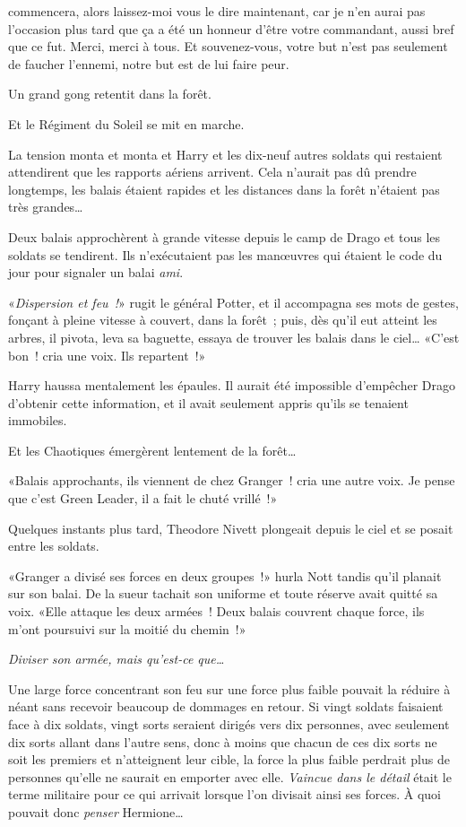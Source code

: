 commencera, alors laissez-moi vous le dire maintenant, car je n'en aurai pas l'occasion plus tard que ça a été un honneur d'être votre commandant, aussi bref que ce fut. Merci, merci à tous. Et souvenez-vous, votre but n'est pas seulement de faucher l'ennemi, notre but est de lui faire peur.

\later

Un grand gong retentit dans la forêt.

Et le Régiment du Soleil se mit en marche.

\later

La tension monta et monta et Harry et les dix-neuf autres soldats qui restaient attendirent que les rapports aériens arrivent. Cela n'aurait pas dû prendre longtemps, les balais étaient rapides et les distances dans la forêt n'étaient pas très grandes…

Deux balais approchèrent à grande vitesse depuis le camp de Drago et tous les soldats se tendirent. Ils n'exécutaient pas les manœuvres qui étaient le code du jour pour signaler un balai \emph{ami}.

«\emph{Dispersion et feu~!}» rugit le général Potter, et il accompagna ses mots de gestes, fonçant à pleine vitesse à couvert, dans la forêt~; puis, dès qu'il eut atteint les arbres, il pivota, leva sa baguette, essaya de trouver les balais dans le ciel…
«C'est bon~! cria une voix. Ils repartent~!»

Harry haussa mentalement les épaules. Il aurait été impossible d'empêcher Drago d'obtenir cette information, et il avait seulement appris qu'ils se tenaient immobiles.

Et les Chaotiques émergèrent lentement de la forêt…

«Balais approchants, ils viennent de chez Granger~! cria une autre voix. Je pense que c'est Green Leader, il a fait le chuté vrillé~!»

Quelques instants plus tard, Theodore Nivett plongeait depuis le ciel et se posait entre les soldats.

«Granger a divisé ses forces en deux groupes~!» hurla Nott tandis qu'il planait sur son balai. De la sueur tachait son uniforme et toute réserve avait quitté sa voix. «Elle attaque les deux armées~! Deux balais couvrent chaque force, ils m'ont poursuivi sur la moitié du chemin~!»

\emph{Diviser son armée, mais qu'est-ce que…}

Une large force concentrant son feu sur une force plus faible pouvait la réduire à néant sans recevoir beaucoup de dommages en retour. Si vingt soldats faisaient face à dix soldats, vingt sorts seraient dirigés vers dix personnes, avec seulement dix sorts allant dans l'autre sens, donc à moins que chacun de ces dix sorts ne soit les premiers et n'atteignent leur cible, la force la plus faible perdrait plus de personnes qu'elle ne saurait en emporter avec elle. \emph{Vaincue dans le détail} était le terme militaire pour ce qui arrivait lorsque l'on divisait ainsi ses forces. À quoi pouvait donc \emph{penser} Hermione…

